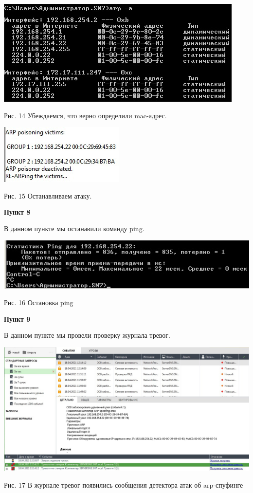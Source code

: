 \documentclass[a4paper,14pt]{extarticle}
\begin{document}
\begin{center}
        \includegraphics[scale=0.8]{pics/7_4.jpg}

        Рис. 14 Убеждаемся, что верно определили mac-адрес.

        \includegraphics[scale=0.9]{pics/7_5.jpg}

        Рис. 15 Останавливаем атаку.
    \end{center}

    \newpage
    \textbf{Пункт 8}
    \vspace{-3ex}
    \begin{center}
        \singlespacing
        В данном пункте мы останавили команду ping.

        \includegraphics[scale=0.8]{pics/8.jpg}

        Рис. 16 Остановка ping
    \end{center}

    \vspace{-2ex}
    \textbf{Пункт 9}
    \vspace{-3ex}
    \begin{center}
        \singlespacing
        В данном пункте мы провели проверку журнала тревог. 

        \includegraphics[scale=0.4]{pics/9.jpg}

        Рис. 17 В журнале тревог появились сообщения детектора атак об arp-спуфинге
    \end{center}
\end{document}
